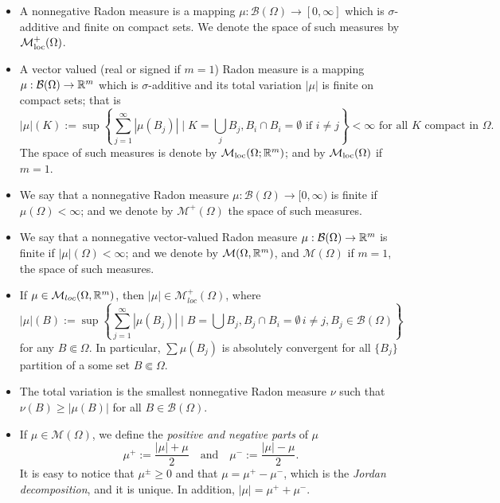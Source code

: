 \begin{definition} \hfill
\begin{itemize}
\item A nonnegative Radon measure is a mapping $\mu : \mathcal{B}(\Omega) \to
[0,\infty]$ which is $\sigma$-additive and finite on compact sets. We denote the space of such measures by $\mathcal{M}_{\rm loc}^{+}(\Omega)$.
\item A vector valued (real or signed if $m = 1$) Radon measure is a mapping $\mu :
\mathcal{B}(\Omega) \to \mathbb{R}^m$ which is $\sigma$-additive and its total variation
$|\mu|$ is finite on compact sets; that is
\[
|\mu|(K) := \sup \left\{
\sum_{j=1}^\infty |\mu(B_j)| \mid K = \bigcup_{j} B_j, B_i \cap B_i = \emptyset
\text{ if } i\neq j
\right\} < \infty \text{ for all $K$ compact in $\Omega$}.
\]
The space of such measures is denote by $\mathcal{M}_{\rm loc}(\Omega; \mathbb{R}^{m})$; and by $\mathcal{M}_{\rm loc}(\Omega)$ if $m = 1$.
\item We say that a nonnegative Radon measure $\mu : \mathcal{B}(\Omega) \to
[0,\infty)$ is finite if $\mu(\Omega) < \infty$; and we denote by $\mathcal{M}^+(\Omega)$ the space of such measures.
\item We say that a nonnegative vector-valued Radon measure $\mu : \mathcal{B}(\Omega) \to
\mathbb{R}^m$ is finite if $|\mu|(\Omega) < \infty$; and we denote by $\mathcal{M}(\Omega,\mathbb{R}^m)$, and $\mathcal{M}(\Omega)$ if $m = 1$, the space of such measures.
\end{itemize}
\end{definition}

\begin{remarks} \hfill
\begin{itemize}
\item If $\mu \in \mathcal{M}_{loc}(\Omega,\mathbb{R}^m)$, then $|\mu| \in
\mathcal{M}^+_{loc}(\Omega)$, where
\[
|\mu|(B) := \sup \left \{\sum_{j=1} ^\infty |\mu(B_j)| \mid 
B= \bigcup B_j, B_j \cap B_i = \emptyset \, i\neq j, B_j \in \mathcal{B}(\Omega)
\right \}
\]
for any $B \Subset \Omega$.
In particular, $\sum \mu(B_j)$ is absolutely convergent for all $\{B_j\}$
partition of a some set $B \Subset \Omega$.
\item The total variation is the smallest nonnegative Radon measure $\nu$ such
that $\nu (B) \geq |\mu(B)|$ for all $B \in \mathcal{B}(\Omega)$.
\item If $\mu \in \mathcal{M}(\Omega)$, we define the {\em positive and negative
parts} of $\mu$ 
\[
\mu^+ := \frac{|\mu| + \mu}{2} \quad \text{and} \quad
\mu^- := \frac{|\mu| - \mu}{2}.
\]
It is easy to notice that $\mu^{\pm} \geq 0$ and that $\mu = \mu^{+} - \mu^{-}$, which is the {\em Jordan decomposition}, and it is unique. In addition, $|\mu| = \mu^{+} + \mu^{-}$.
\end{itemize}
\end{remarks}

